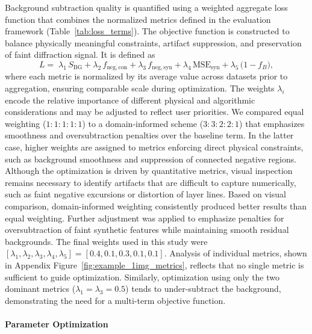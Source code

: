 \documentclass[iucr]{iucrjournals}
\begin{document}
Background subtraction quality is quantified using a weighted aggregate loss function that combines the normalized metrics defined in the evaluation framework (Table~\ref{tab:loss_terms}). The objective function is constructed to balance physically meaningful constraints, artifact suppression, and preservation of faint diffraction signal. It is defined as
\begin{equation}
L =\;
\lambda_1\, S_{\mathrm{BG}}
+ \lambda_2\, f_{\mathrm{neg,con}}
+ \lambda_3\, f_{\mathrm{neg,syn}}
+ \lambda_4\, \mathrm{MSE}_{\mathrm{syn}}
+ \lambda_5\, \bigl(1 - f_{B}\bigr),
\end{equation}
where each metric is normalized by its average value across datasets prior to aggregation, ensuring comparable scale during optimization. The weights $\lambda_i$ encode the relative importance of different physical and algorithmic considerations and may be adjusted to reflect user priorities. We compared equal weighting ($1\!:\!1\!:\!1\!:\!1\!:\!1$) to a domain-informed scheme ($3\!:\!3\!:\!2\!:\!2\!:\!1$) that emphasizes smoothness and oversubtraction penalties over the baseline term. In the latter case, higher weights are assigned to metrics enforcing direct physical constraints, such as background smoothness and suppression of connected negative regions. Although the optimization is driven by quantitative metrics, visual inspection remains necessary to identify artifacts that are difficult to capture numerically, such as faint negative excursions or distortion of layer lines. Based on visual comparison, domain-informed weighting consistently produced better results than equal weighting. Further adjustment was applied to emphasize penalties for oversubtraction of faint synthetic features while maintaining smooth residual backgrounds. The final weights used in this study were $[\lambda_1, \lambda_2, \lambda_3, \lambda_4, \lambda_5] = [0.4, 0.1, 0.3, 0.1, 0.1]$. Analysis of individual metrics, shown in Appendix Figure~\ref{fig:example_1img_metrics}, reflects that no single metric is sufficient to guide optimization. Similarly, optimization using only the two dominant metrics ($\lambda_1 = \lambda_3 = 0.5$) tends to under-subtract the background, demonstrating the need for a multi-term objective function.


\paragraph{Parameter Optimization}
\end{document}
